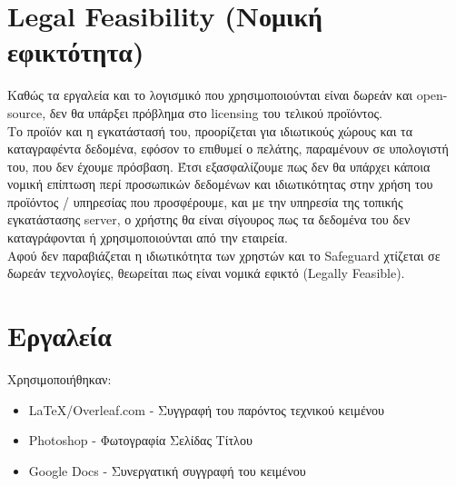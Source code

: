 \documentclass{article}
\begin{document}
\section{Legal Feasibility (Νομική εφικτότητα)}
Καθώς τα εργαλεία και το λογισμικό που χρησιμοποιούνται είναι δωρεάν και open-source, δεν θα υπάρξει πρόβλημα στο licensing του τελικού προϊόντος. \\
Το προϊόν και η εγκατάστασή του, προορίζεται για ιδιωτικούς χώρους και τα καταγραφέντα δεδομένα, εφόσον το επιθυμεί ο πελάτης, παραμένουν σε υπολογιστή του, που δεν έχουμε πρόσβαση. Έτσι εξασφαλίζουμε πως δεν θα υπάρχει κάποια νομική επίπτωση περί προσωπικών δεδομένων και ιδιωτικότητας στην χρήση του προϊόντος / υπηρεσίας που προσφέρουμε, και με την υπηρεσία της τοπικής εγκατάστασης server, ο χρήστης θα είναι σίγουρος πως τα δεδομένα του δεν καταγράφονται ή χρησιμοποιούνται από την εταιρεία. \\
Αφού δεν παραβιάζεται η ιδιωτικότητα των χρηστών και το Safeguard χτίζεται σε δωρεάν τεχνολογίες, θεωρείται πως είναι νομικά εφικτό (Legally Feasible).
\section{Εργαλεία}
Χρησιμοποιήθηκαν:
\begin{itemize}
    \item \LaTeX/Overleaf.com - Συγγραφή του παρόντος τεχνικού κειμένου
    \item Photoshop - Φωτογραφία Σελίδας Τίτλου
    \item Google Docs - Συνεργατική συγγραφή του κειμένου
\end{itemize}
\end{document}
